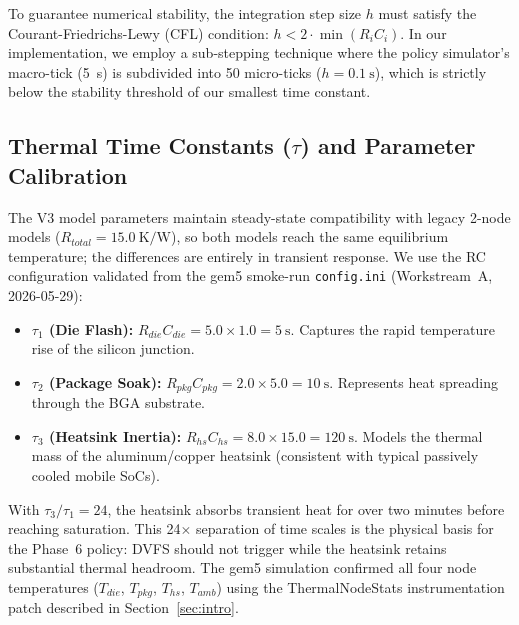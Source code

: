 To guarantee numerical stability, the integration step size $h$ must satisfy the Courant-Friedrichs-Lewy (CFL) condition: $h < 2 \cdot \min(R_i C_i)$. In our implementation, we employ a sub-stepping technique where the policy simulator's macro-tick (\SI{5}{\second}) is subdivided into 50 micro-ticks ($h = \SI{0.1}{\second}$), which is strictly below the stability threshold of our smallest time constant.

\subsection{Thermal Time Constants ($\tau$) and Parameter Calibration}

The V3 model parameters maintain steady-state compatibility with legacy 2-node models ($R_{total} = \SI{15.0}{\kelvin\per\watt}$), so both models reach the same equilibrium temperature; the differences are entirely in transient response. We use the RC configuration validated from the gem5 smoke-run \texttt{config.ini} (Workstream~A, 2026-05-29):

\begin{itemize}
    \item \textbf{$\tau_1$ (Die Flash):} $R_{die}C_{die} = 5.0 \times 1.0 = \SI{5}{\second}$. Captures the rapid temperature rise of the silicon junction.
    \item \textbf{$\tau_2$ (Package Soak):} $R_{pkg}C_{pkg} = 2.0 \times 5.0 = \SI{10}{\second}$. Represents heat spreading through the BGA substrate.
    \item \textbf{$\tau_3$ (Heatsink Inertia):} $R_{hs}C_{hs} = 8.0 \times 15.0 = \SI{120}{\second}$. Models the thermal mass of the aluminum/copper heatsink (consistent with typical passively cooled mobile SoCs).
\end{itemize}

With $\tau_3/\tau_1 = 24$, the heatsink absorbs transient heat for over two minutes before reaching saturation. This 24$\times$ separation of time scales is the physical basis for the Phase~6 policy: DVFS should not trigger while the heatsink retains substantial thermal headroom. The gem5 simulation confirmed all four node temperatures ($T_{die}$, $T_{pkg}$, $T_{hs}$, $T_{amb}$) using the ThermalNodeStats instrumentation patch described in Section~\ref{sec:intro}.
